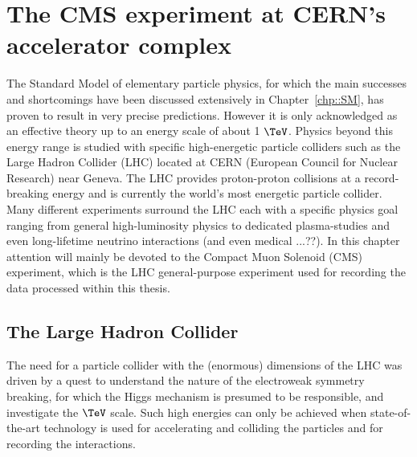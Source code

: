 \chapter{The CMS experiment at CERN's accelerator complex} \label{chp:CERN}

The Standard Model of elementary particle physics, for which the main successes and shortcomings have been discussed extensively in Chapter~\ref{chp::SM}, has proven to result in very precise predictions. However it is only acknowledged as an effective theory up to an energy scale of about 1 $\TeV$. Physics beyond this energy range is studied with specific high-energetic particle colliders such as the Large Hadron Collider (LHC) located at CERN (European Council for Nuclear Research) near Geneva. The LHC provides proton-proton collisions at a record-breaking energy and is currently the world's most energetic particle collider.\\
Many different experiments surround the LHC each with a specific physics goal ranging from general high-luminosity physics to dedicated plasma-studies and even long-lifetime neutrino interactions (and even medical ...??).
In this chapter attention will mainly be devoted to the Compact Muon Solenoid (CMS) experiment, which is the LHC general-purpose experiment used for recording the data processed within this thesis.

\section{The Large Hadron Collider}
The need for a particle collider with the (enormous) dimensions of the LHC was driven by a quest to understand the nature of the electroweak symmetry breaking, for which the Higgs mechanism is presumed to be responsible, and investigate the $\TeV$ scale.
Such high energies can only be achieved when state-of-the-art technology is used for accelerating and colliding the particles and for recording the interactions.
\\

